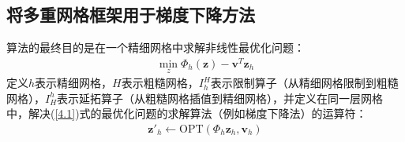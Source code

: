 \documentclass[10pt,aspectratio=169]{beamer} %
\renewcommand{\vec}[1]{\boldsymbol{#1}} %
\begin{document}
\subsection{将多重网格框架用于梯度下降方法}
\begin{frame}[allowframebreaks]
    算法的最终目的是在一个精细网格中求解非线性最优化问题：
    \begin{align}
        \min \limits_z \Phi_h (\vec{z}) - \vec{v}^T \vec{z}_h \label{4.1}
    \end{align}
    定义$h$表示精细网格，$H$表示粗糙网格，$I_h^H$表示限制算子（从精细网格限制到粗糙网格），$I_H^h$表示延拓算子（从粗糙网格插值到精细网格），并定义在同一层网格中，解决(\ref{4.1})式的最优化问题的求解算法（例如梯度下降法）的运算符：
    \begin{align*}
        \vec{z}'_h\leftarrow\mathrm{OPT}\left( \Phi_h \vec{z}_h, \vec{v}_h \right)
    \end{align*}


\end{frame}
\end{document}
